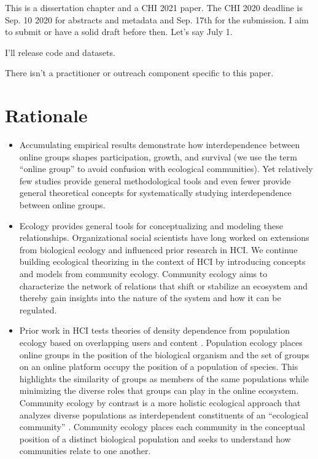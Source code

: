 \documentclass[12pt]{memoir}
\begin{document}
This is a dissertation chapter and a CHI 2021 paper. The CHI 2020 deadline is Sep. 10 2020 for abstracts and metadata and Sep. 17th for the submission. I aim to submit or have a solid draft before then. Let's say July 1. 

I'll release code and datasets.

There isn't a practitioner or outreach component specific to this paper. 

\section{Rationale}

\begin{itemize}
\item Accumulating empirical results demonstrate how interdependence between online groups shapes participation, growth, and survival (we use the term ``online group'' to avoid confusion with ecological communities).  Yet relatively few studies provide general methodological tools and even fewer provide general theoretical concepts for systematically studying interdependence between online groups. 

\item Ecology provides general tools for conceptualizing and modeling these relationships.  Organizational social scientists have long worked on extensions from biological ecology and influenced prior research in HCI.  We continue building ecological theorizing in the context of HCI by introducing concepts and models from community ecology.  Community ecology aims to characterize the network of relations that shift or stabilize an ecosystem and thereby gain insights into the nature of the system and how it can be regulated.  

\item Prior work in HCI tests theories of density dependence from population ecology based on overlapping users and content \citep{zhu_impact_2014,zhu_selecting_2014,wang_impact_2013}.  Population ecology places online groups in the position of the biological organism and the set of groups on an online platform occupy the position of a population of species.  This highlights the similarity of groups as members of the same populations while minimizing the diverse roles that groups can play in the online ecosystem.   Community ecology by contrast is a more holistic ecological approach that analyzes diverse populations as interdependent constituents of an ``ecological community'' \citep{astley_two_1985-1}.  Community ecology places each community in the conceptual position of a distinct biological population and seeks to understand how communities relate to one another.  


\end{itemize}
\end{document}
